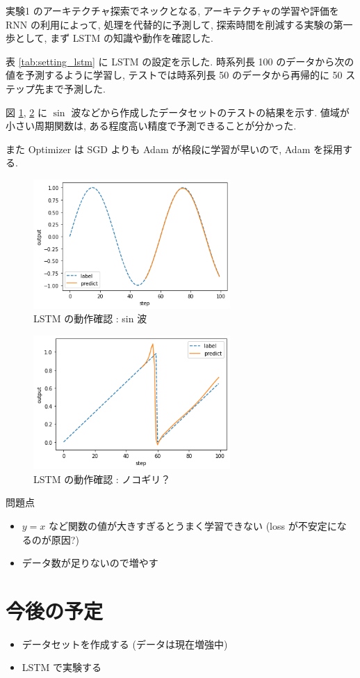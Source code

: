 \documentclass[twocolumn]{jarticle}     %
\begin{document}
実験1 のアーキテクチャ探索でネックとなる, アーキテクチャの学習や評価を RNN の利用によって,
処理を代替的に予測して, 探索時間を削減する実験の第一歩として, まず LSTM の知識や動作を確認した.


表 \ref{tab:setting_lstm} に LSTM の設定を示した.
時系列長 100 のデータから次の値を予測するように学習し,
テストでは時系列長 50 のデータから再帰的に 50 ステップ先まで予測した.

図 \ref{fig:lstm}, \ref{fig:lstm2} に $\sin$ 波などから作成したデータセットのテストの結果を示す.
値域が小さい周期関数は, ある程度高い精度で予測できることが分かった.

また Optimizer は SGD よりも Adam が格段に学習が早いので, Adam を採用する.


\begin{figure}[tb]
  \begin{center}
    \includegraphics[clip,width=75mm]{lstm_sin.png}
    \caption{LSTM の動作確認 : sin 波}
    \label{fig:lstm}
  \end{center}
\end{figure}
\begin{figure}[tb]
  \begin{center}
    \includegraphics[clip,width=75mm]{lstm.png}
    \caption{LSTM の動作確認 : ノコギリ？}
    \label{fig:lstm2}
  \end{center}
\end{figure}

問題点
\begin{itemize}
  \item $y = x$ など関数の値が大きすぎるとうまく学習できない (loss が不安定になるのが原因?)
  \item データ数が足りないので増やす
\end{itemize}

\section{今後の予定}
\begin{itemize}
  \item データセットを作成する (データは現在増強中)
  \item LSTM で実験する
\end{itemize}



\end{document}
